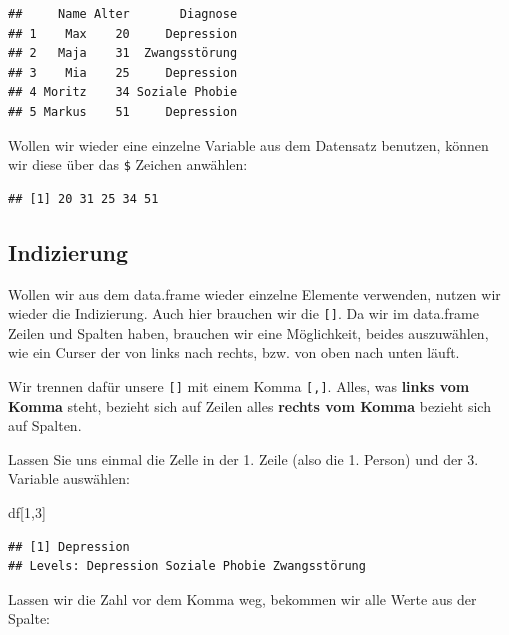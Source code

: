\documentclass[
]{book}
\newenvironment{Shaded}{\begin{snugshade}}{\end{snugshade}}
\newcommand{\DecValTok}[1]{\textcolor[rgb]{0.00,0.00,0.81}{#1}}
\newcommand{\NormalTok}[1]{#1}
\newcommand{\SpecialCharTok}[1]{\textcolor[rgb]{0.00,0.00,0.00}{#1}}
\begin{document}
\begin{verbatim}
##     Name Alter       Diagnose
## 1    Max    20     Depression
## 2   Maja    31  Zwangsstörung
## 3    Mia    25     Depression
## 4 Moritz    34 Soziale Phobie
## 5 Markus    51     Depression
\end{verbatim}

Wollen wir wieder eine einzelne Variable aus dem Datensatz benutzen, können wir diese über das \texttt{\$} Zeichen anwählen:

\begin{Shaded}
\end{Shaded}

\begin{verbatim}
## [1] 20 31 25 34 51
\end{verbatim}

\hypertarget{indizierung}{%
\subsection{Indizierung}\label{indizierung}}

Wollen wir aus dem data.frame wieder einzelne Elemente verwenden, nutzen wir wieder die Indizierung. Auch hier brauchen wir die \texttt{{[}{]}}. Da wir im data.frame Zeilen und Spalten haben, brauchen wir eine Möglichkeit, beides auszuwählen, wie ein Curser der von links nach rechts, bzw. von oben nach unten läuft.

Wir trennen dafür unsere \texttt{{[}{]}} mit einem Komma \texttt{{[},{]}}. Alles, was \textbf{links vom Komma} steht, bezieht sich auf Zeilen alles \textbf{rechts vom Komma} bezieht sich auf Spalten.

Lassen Sie uns einmal die Zelle in der 1. Zeile (also die 1. Person) und der 3. Variable auswählen:

\begin{Shaded}
\begin{Highlighting}[]
\NormalTok{df[}\DecValTok{1}\NormalTok{,}\DecValTok{3}\NormalTok{]}
\end{Highlighting}
\end{Shaded}

\begin{verbatim}
## [1] Depression
## Levels: Depression Soziale Phobie Zwangsstörung
\end{verbatim}

Lassen wir die Zahl vor dem Komma weg, bekommen wir alle Werte aus der Spalte:
\end{document}
